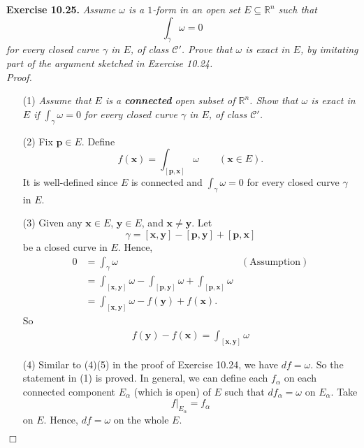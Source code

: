 \documentclass{article}
\begin{document}



\textbf{Exercise 10.25.}
\emph{Assume $\omega$ is a $1$-form in an open set $E \subseteq \mathbb{R}^n$
such that
\[
  \int_{\gamma} \omega = 0
\]
for every closed curve $\gamma$ in $E$, of class $\mathscr{C}'$.
Prove that $\omega$ is exact in $E$,
by imitating part of the argument sketched in Exercise 10.24.} \\



\emph{Proof.}
\begin{enumerate}
\item[(1)]
  \emph{Assume that $E$ is a \textbf{connected} open subset of $\mathbb{R}^n$.
  Show that $\omega$ is exact in $E$
  if $\int_{\gamma} \omega = 0$
  for every closed curve $\gamma$ in $E$, of class $\mathscr{C}'$.}

\item[(2)]
  Fix $\mathbf{p} \in E$.
  Define
  \[
    f(\mathbf{x}) = \int_{[\mathbf{p},\mathbf{x}]} \omega
    \qquad
    (\mathbf{x} \in E).
  \]
  It is well-defined since $E$ is connected and
  $\int_{\gamma} \omega = 0$ for every closed curve $\gamma$ in $E$.

\item[(3)]
  Given any $\mathbf{x} \in E$, $\mathbf{y} \in E$, and $\mathbf{x} \neq \mathbf{y}$.
  Let
  \[
    \gamma = [\mathbf{x},\mathbf{y}] - [\mathbf{p},\mathbf{y}] + [\mathbf{p},\mathbf{x}]
  \]
  be a closed curve in $E$.
  Hence,
  \begin{align*}
    0
    &= \int_{\gamma} \omega
      &(\text{Assumption}) \\
    &= \int_{[\mathbf{x},\mathbf{y}]} \omega
      - \int_{[\mathbf{p},\mathbf{y}]} \omega
      + \int_{[\mathbf{p},\mathbf{x}]} \omega \\
    &= \int_{[\mathbf{x},\mathbf{y}]} \omega - f(\mathbf{y}) + f(\mathbf{x}).
  \end{align*}
  So
  \begin{align*}
    f(\mathbf{y}) - f(\mathbf{x}) = \int_{[\mathbf{x},\mathbf{y}]} \omega
  \end{align*}

\item[(4)]
  Similar to (4)(5) in the proof of Exercise 10.24, we have $df = \omega$.
  So the statement in (1) is proved.
  In general, we can define each $f_{\alpha}$
  on each connected component $E_{\alpha}$ (which is open) of $E$
  such that $d f_{\alpha} = \omega$ on $E_{\alpha}$.
  Take
  \[
    f|_{E_{\alpha}} = f_{\alpha}
  \]
  on $E$.
  Hence, $df = \omega$ on the whole $E$.
\end{enumerate}
$\Box$ \\\\
\end{document}
